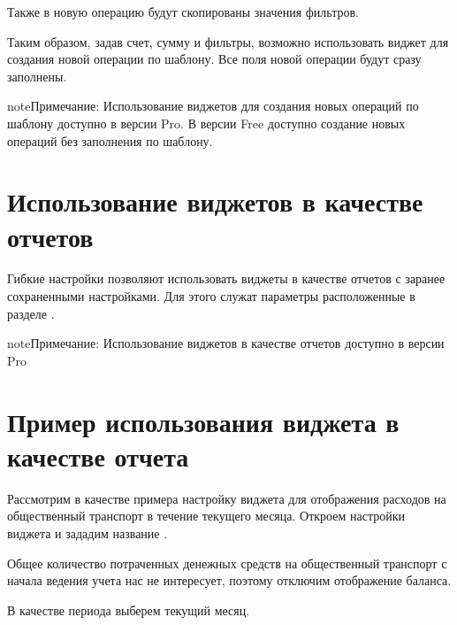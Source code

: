 \documentclass[a4paper,10pt,russian]{sphinxmanual}
\begin{document}
Также в новую операцию будут скопированы значения фильтров.

Таким образом, задав счет, сумму и фильтры, возможно использовать виджет для создания новой операции по шаблону. Все
поля новой операции будут сразу заполнены.

\begin{sphinxadmonition}{note}{Примечание:}
Использование виджетов для создания новых операций по шаблону доступно в версии Pro. В версии Free доступно создание новых операций без заполнения по шаблону.
\end{sphinxadmonition}


\section{Использование виджетов в качестве отчетов}
\label{\detokenize{widgets:id4}}
Гибкие настройки позволяют использовать виджеты в качестве отчетов с заранее сохраненными настройками. Для этого
служат параметры расположенные в разделе .

\begin{sphinxadmonition}{note}{Примечание:}
Использование виджетов в качестве отчетов доступно в версии Pro
\end{sphinxadmonition}


\section{Пример использования виджета в качестве отчета}
\label{\detokenize{widgets:id5}}
Рассмотрим в качестве примера настройку виджета для отображения расходов на общественный транспорт в течение текущего месяца.
Откроем настройки виджета и зададим название .

\noindent{}

\noindent{}

\noindent{}

Общее количество потраченных денежных средств на общественный транспорт с начала ведения учета нас не интересует,
поэтому отключим отображение баланса.

В качестве периода выберем текущий месяц.

\noindent{}
\end{document}
